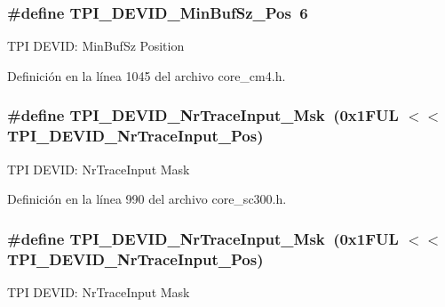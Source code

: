 \subsubsection[{\texorpdfstring{T\+P\+I\+\_\+\+D\+E\+V\+I\+D\+\_\+\+Min\+Buf\+Sz\+\_\+\+Pos}{TPI_DEVID_MinBufSz_Pos}}]{\setlength{\rightskip}{0pt plus 5cm}\#define T\+P\+I\+\_\+\+D\+E\+V\+I\+D\+\_\+\+Min\+Buf\+Sz\+\_\+\+Pos~6}\hypertarget{group___c_m_s_i_s___t_p_i_ga3f7da5de2a34be41a092e5eddd22ac4d}{}\label{group___c_m_s_i_s___t_p_i_ga3f7da5de2a34be41a092e5eddd22ac4d}
T\+PI D\+E\+V\+ID\+: Min\+Buf\+Sz Position 

Definición en la línea 1045 del archivo core\+\_\+cm4.\+h.

\subsubsection[{\texorpdfstring{T\+P\+I\+\_\+\+D\+E\+V\+I\+D\+\_\+\+Nr\+Trace\+Input\+\_\+\+Msk}{TPI_DEVID_NrTraceInput_Msk}}]{\setlength{\rightskip}{0pt plus 5cm}\#define T\+P\+I\+\_\+\+D\+E\+V\+I\+D\+\_\+\+Nr\+Trace\+Input\+\_\+\+Msk~(0x1\+F\+U\+L $<$$<$ T\+P\+I\+\_\+\+D\+E\+V\+I\+D\+\_\+\+Nr\+Trace\+Input\+\_\+\+Pos)}\hypertarget{group___c_m_s_i_s___t_p_i_gabed454418d2140043cd65ec899abd97f}{}\label{group___c_m_s_i_s___t_p_i_gabed454418d2140043cd65ec899abd97f}
T\+PI D\+E\+V\+ID\+: Nr\+Trace\+Input Mask 

Definición en la línea 990 del archivo core\+\_\+sc300.\+h.

\subsubsection[{\texorpdfstring{T\+P\+I\+\_\+\+D\+E\+V\+I\+D\+\_\+\+Nr\+Trace\+Input\+\_\+\+Msk}{TPI_DEVID_NrTraceInput_Msk}}]{\setlength{\rightskip}{0pt plus 5cm}\#define T\+P\+I\+\_\+\+D\+E\+V\+I\+D\+\_\+\+Nr\+Trace\+Input\+\_\+\+Msk~(0x1\+F\+U\+L $<$$<$ T\+P\+I\+\_\+\+D\+E\+V\+I\+D\+\_\+\+Nr\+Trace\+Input\+\_\+\+Pos)}\hypertarget{group___c_m_s_i_s___t_p_i_gabed454418d2140043cd65ec899abd97f}{}\label{group___c_m_s_i_s___t_p_i_gabed454418d2140043cd65ec899abd97f}
T\+PI D\+E\+V\+ID\+: Nr\+Trace\+Input Mask 


